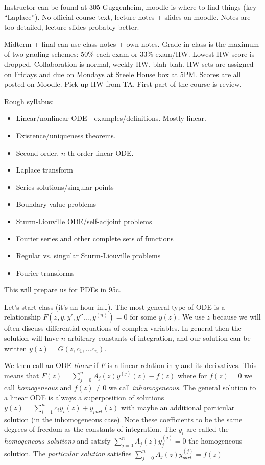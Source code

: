 \documentclass[10pt]{report}
\begin{document}
Instructor can be found at 305 Guggenheim, moodle is where to find things (key ``Laplace''). No official course text, lecture notes + slides on moodle. Notes are too detailed, lecture slides probably better.

Midterm + final can use class notes + own notes. Grade in class is the maximum of two grading schemes: 50\% each exam or 33\% exam/HW. Lowest HW score is dropped. Collaboration is normal, weekly HW, blah blah. HW sets are assigned on Fridays and due on Mondays at Steele House box at 5PM. Scores are all posted on Moodle. Pick up HW from TA. First part of the course is review.

Rough syllabus:
\begin{itemize}
    \item Linear/nonlinear ODE - examples/definitions. Mostly linear. 
    \item Existence/uniqueness theorems. 
    \item Second-order, $n$-th order linear ODE.
    \item Laplace transform
    \item Series solutions/singular points
    \item Boundary value problems
    \item Sturm-Liouville ODE/self-adjoint problems
    \item Fourier series and other complete sets of functions
    \item Regular vs. singular Sturm-Liouville problems
    \item Fourier transforms
\end{itemize}

This will prepare us for PDEs in 95c. 

Let's start class (it's an hour in\dots). The most general type of ODE is a relationship $F(z,y,y', y''\dots, y^{(n)}) = 0$ for some $y(z)$. We use $z$ because we will often discuss differential equations of complex variables. In general then the solution will have $n$ arbitrary constants of integration, and our solution can be written $y(z) = G(z,c_1,\dots c_n)$. 

We then call an ODE \emph{linear} if $F$ is a linear relation in $y$ and its derivatives. This means that $F(z) = \sum_{j=0}^{n}A_j(z)y^{(j)}(z) - f(z)$ where for $f(z) = 0$ we call \emph{homogeneous} and $f(z) \neq 0$ we call \emph{inhomogeneous}. The general solution to a linear ODE is always a superposition of solutions $y(z) = \sum_{i=1}^{n}c_iy_i(z) + y_{part}(z)$ with maybe an additional particular solution (in the inhomogeneous case). Note these coefficients to be the same degrees of freedom as the constants of integration. The $y_i$ are called the \emph{homogeneous solutions} and satisfy $\sum_{j=0}^{n}A_j(z)y_j^{(j)} = 0$ the homogeneous solution. The \emph{particular solution} satisfies $\sum_{j=0}^{n}A_j(z)y_{part}^{(j)} = f(z)$
\end{document}
